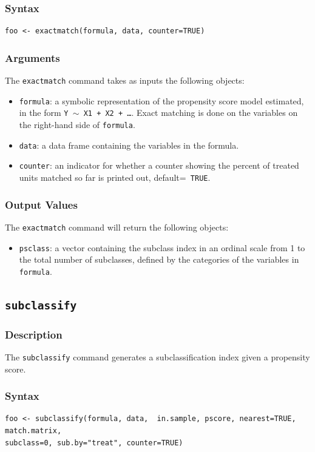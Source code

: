 \documentclass[oneside,letterpaper,titlepage]{article}
\begin{document}
\begin{appendix}
\subsubsection{Syntax}
\begin{verbatim}
foo <- exactmatch(formula, data, counter=TRUE)
\end{verbatim} 

\subsubsection{Arguments}
The \texttt{exactmatch} command takes as inputs the following
objects:
\begin{itemize}
\item \texttt{formula}: a symbolic representation of the propensity
  score model estimated, in the form {\tt Y $\sim$ X1 + X2 + \dots}.
  Exact matching is done on the variables on the right-hand side of
  \texttt{formula}.
\item \texttt{data}: a data frame containing the variables in the
  formula.
\item \texttt{counter}: an indicator for whether a counter showing the
  percent of treated units matched so far is printed out, default={\tt
    TRUE}.
\end{itemize}

\subsubsection{Output Values}
The \texttt{exactmatch} command will return the following objects:
\begin{itemize}
\item \texttt{psclass}: a vector containing the subclass index in an ordinal
  scale from 1 to the total number of subclasses, defined by the
  categories of the variables in {\tt formula}.
\end{itemize}

\subsection{\texttt{subclassify}}

\subsubsection{Description}
The \texttt{subclassify} command generates a subclassification index
given a propensity score. 

\subsubsection{Syntax}
\begin{verbatim}
foo <- subclassify(formula, data,  in.sample, pscore, nearest=TRUE, match.matrix,
subclass=0, sub.by="treat", counter=TRUE)
\end{verbatim} 


\end{appendix}
\end{document}
